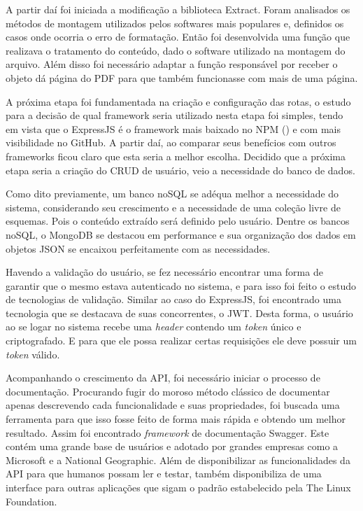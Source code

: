 A partir daí foi iniciada a modificação a biblioteca Extract. Foram analisados os métodos de montagem utilizados pelos softwares mais populares e, definidos os casos onde ocorria o erro de formatação. Então foi desenvolvida uma função que realizava o tratamento do conteúdo, dado o software utilizado na montagem do arquivo. Além disso foi necessário adaptar a função responsável por receber o objeto dá página do PDF para que também funcionasse com mais de uma página.

A próxima etapa foi fundamentada na criação e configuração das rotas, o estudo para a decisão de qual framework seria utilizado nesta etapa foi simples, tendo em vista que o ExpressJS é o framework mais baixado no NPM (\cite{npm}) e com mais visibilidade no GitHub. A partir daí, ao comparar seus benefícios com outros frameworks ficou claro que esta seria a melhor escolha.
Decidido que a próxima etapa seria a criação do CRUD de usuário, veio a necessidade do banco de dados. 

Como dito previamente, um banco noSQL se adéqua melhor a necessidade do sistema, considerando seu crescimento e a necessidade de uma coleção livre de esquemas. Pois o conteúdo extraído será definido pelo usuário. Dentre os bancos noSQL, o MongoDB se destacou em performance e sua organização dos dados em objetos JSON se encaixou perfeitamente com as necessidades. 

Havendo a validação do usuário, se fez necessário encontrar uma forma de garantir que o mesmo estava autenticado no sistema, e para isso foi feito o estudo de tecnologias de validação. Similar ao caso do ExpressJS, foi encontrado uma tecnologia que se destacava de suas concorrentes, o JWT. Desta forma, o usuário ao se logar no sistema recebe uma \textit{header}  contendo um \textit{token} único e criptografado. E para que ele possa realizar certas requisições ele deve possuir um \textit{token} válido.

Acompanhando o crescimento da API, foi necessário iniciar o processo de documentação. Procurando fugir do moroso método clássico de documentar apenas descrevendo cada funcionalidade e suas propriedades, foi buscada uma ferramenta para que isso fosse feito de forma mais rápida e obtendo um melhor resultado.
Assim foi encontrado \textit{framework} de documentação Swagger. Este contém uma grande base de usuários e adotado por grandes empresas como a Microsoft e a National Geographic. Além de disponibilizar as funcionalidades da API para que humanos possam ler e testar, também disponibiliza de uma interface para outras aplicações que sigam o padrão estabelecido pela The Linux Foundation.

